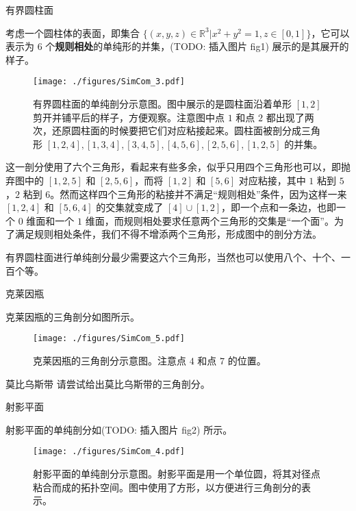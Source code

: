 \begin{example}{有界圆柱面}

考虑一个圆柱体的表面，即集合 $\{(x, y, z)\in\mathbb{R}^3|x^2+y^2=1, z\in [0, 1]\}$，它可以表示为 $6$ 个\textbf{规则相处}的单纯形的并集，(TODO: 插入图片 fig1) 展示的是其展开的样子。

\begin{figure}[ht]
\centering
\texttt{[image: ./figures/SimCom\_3.pdf]}
\caption{有界圆柱面的单纯剖分示意图。图中展示的是圆柱面沿着单形 $[1, 2]$ 剪开并铺平后的样子，方便观察。注意图中点 $1$ 和点 $2$ 都出现了两次，还原圆柱面的时候要把它们对应粘接起来。圆柱面被剖分成三角形 $[1,2,4], [1,3,4], [3,4,5], [4,5,6], [2,5,6], [1,2,5]$ 的并集。} \label{SimCom_fig3}
\end{figure}


这一剖分使用了六个三角形，看起来有些多余，似乎只用四个三角形也可以，即抛弃图中的 $[1,2,5]$ 和 $[2,5,6]$，而将 $[1, 2]$ 和 $[5, 6]$ 对应粘接，其中 $1$ 粘到 $5$，$2$ 粘到 $6$。然而这样四个三角形的粘接并不满足“规则相处”条件，因为这样一来 $[1, 2, 4]$ 和 $[5, 6, 4]$ 的交集就变成了 $[4]\cup[1, 2]$，即一个点和一条边，也即一个 $0$ 维面和一个 $1$ 维面，而规则相处要求任意两个三角形的交集是“一个面”。为了满足规则相处条件，我们不得不增添两个三角形，形成图中的剖分方法。



有界圆柱面进行单纯剖分最少需要这六个三角形，当然也可以使用八个、十个、一百个等。

\end{example}


\begin{example}{克莱因瓶}

克莱因瓶的三角剖分如图所示。

\begin{figure}[ht]
\centering
\texttt{[image: ./figures/SimCom\_5.pdf]}
\caption{克莱因瓶的三角剖分示意图。注意点 $4$ 和点 $7$ 的位置。} \label{SimCom_fig5}
\end{figure}

\end{example}


\begin{exercise}{莫比乌斯带}
请尝试给出莫比乌斯带的三角剖分。
\end{exercise}


\begin{example}{射影平面}

射影平面的单纯剖分如(TODO: 插入图片 fig2) 所示。

\begin{figure}[ht]
\centering
\texttt{[image: ./figures/SimCom\_4.pdf]}
\caption{射影平面的单纯剖分示意图。射影平面是用一个单位圆，将其对径点粘合而成的拓扑空间。图中使用了方形，以方便进行三角剖分的表示。} \label{SimCom_fig4}
\end{figure}

\end{example}


